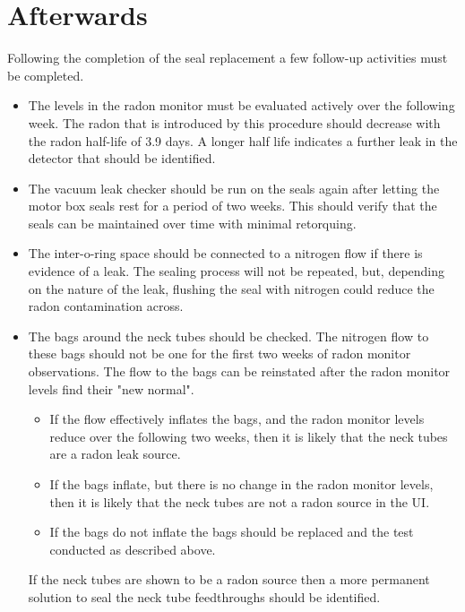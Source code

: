 \documentclass[11pt]{article}
\begin{document}
\section{Afterwards}
Following the completion of the seal replacement a few follow-up activities must be completed.
\begin{itemize}
\item The levels in the radon monitor must be evaluated actively over the following week. The radon that is introduced by this procedure should decrease with the radon half-life of 3.9 days. A longer half life indicates a further leak in the detector that should be identified.
\item The vacuum leak checker should be run on the seals again after letting the motor box seals rest for a period of two weeks. This should verify that the seals can be maintained over time with minimal retorquing. 
\item The inter-o-ring space should be connected to a nitrogen flow if there is evidence of a leak. The sealing process will not be repeated, but, depending on the nature of the leak, flushing the seal with nitrogen could reduce the radon contamination across. 
\item The bags around the neck tubes should be checked. The nitrogen flow to these bags should not be one for the first two weeks of radon monitor observations. The flow to the bags can be reinstated after the radon monitor levels find their "new normal".  
	\begin{itemize}
	\item If the flow effectively inflates the bags, and the radon monitor levels reduce over the following two weeks, then it is likely that the neck tubes are a radon leak source. 
	\item If the bags inflate, but there is no change in the radon monitor levels, then it is likely that the neck tubes are not a radon source in the UI. 
	\item If the bags do not inflate the bags should be replaced and the test conducted as described above. 
	\end{itemize}
If the neck tubes are shown to be a radon source then a more permanent solution to seal the neck tube feedthroughs should be identified.
\end{itemize}
	
\end{document}
